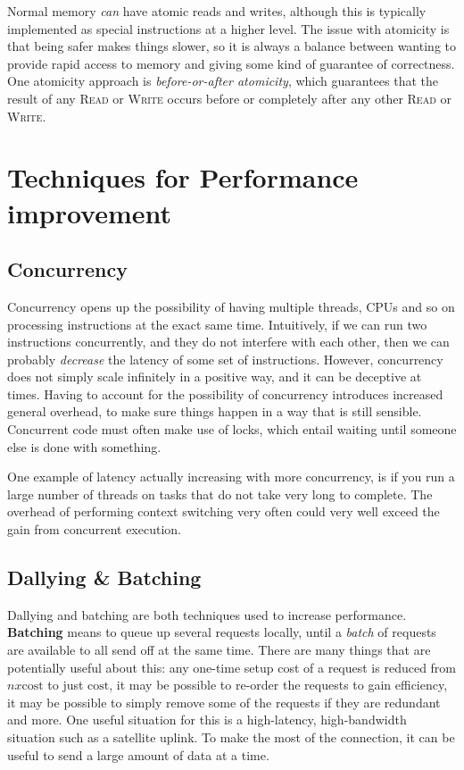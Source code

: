Normal memory \textit{can} have atomic reads and writes, although this is
typically implemented as special instructions at a higher level. The issue with
atomicity is that being safer makes things slower, so it is always a balance
between wanting to provide rapid access to memory and giving some kind of
guarantee of correctness. One atomicity approach is \textit{before-or-after
atomicity}, which guarantees that the result of any \textsc{Read} or
\textsc{Write} occurs before or completely after any other \textsc{Read} or
\textsc{Write}.

\section{Techniques for Performance improvement}
\subsection{Concurrency}
Concurrency opens up the possibility of having multiple threads, CPUs and so on
processing instructions at the exact same time. Intuitively, if we can run two
instructions concurrently, and they do not interfere with each other, then we
can probably \textit{decrease} the latency of some set of instructions. However,
concurrency does not simply scale infinitely in a positive way, and it can be
deceptive at times. Having to account for the possibility of concurrency
introduces increased general overhead, to make sure things happen in a way that
is still sensible. Concurrent code must often make use of locks, which entail
waiting until someone else is done with something.

One example of latency actually increasing with more concurrency, is if you run
a large number of threads on tasks that do not take very long to complete. The
overhead of performing context switching very often could very well exceed the
gain from concurrent execution.

\subsection{Dallying \& Batching}
Dallying and batching are both techniques used to increase performance.
\textbf{Batching} means to queue up several requests locally, until a
\textit{batch} of requests are available to all send off at the same time.
There are many things that are potentially useful about this: any one-time setup
cost of a request is reduced from $n x \text{cost}$ to just $\text{cost}$, it
may be possible to re-order the requests to gain efficiency, it may be possible
to simply remove some of the requests if they are redundant and more. One
useful situation for this is a high-latency, high-bandwidth situation such as a
satellite uplink. To make the most of the connection, it can be useful to send a
large amount of data at a time.

